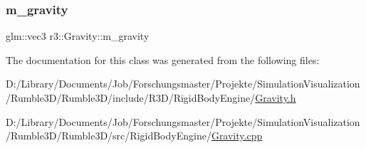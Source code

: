 \subsubsection{\texorpdfstring{m\+\_\+gravity}{m\_gravity}}
{\footnotesize\ttfamily glm\+::vec3 r3\+::\+Gravity\+::m\+\_\+gravity\hspace{0.3cm}{\ttfamily [protected]}}



The documentation for this class was generated from the following files\+:\begin{DoxyCompactItemize}
\item 
D\+:/\+Library/\+Documents/\+Job/\+Forschungsmaster/\+Projekte/\+Simulation\+Visualization/\+Rumble3\+D/\+Rumble3\+D/include/\+R3\+D/\+Rigid\+Body\+Engine/\mbox{\hyperlink{_gravity_8h}{Gravity.\+h}}\item 
D\+:/\+Library/\+Documents/\+Job/\+Forschungsmaster/\+Projekte/\+Simulation\+Visualization/\+Rumble3\+D/\+Rumble3\+D/src/\+Rigid\+Body\+Engine/\mbox{\hyperlink{_gravity_8cpp}{Gravity.\+cpp}}\end{DoxyCompactItemize}
